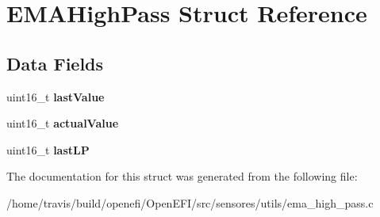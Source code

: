 \hypertarget{structEMAHighPass}{}\section{E\+M\+A\+High\+Pass Struct Reference}
\label{structEMAHighPass}
\subsection*{Data Fields}
\begin{DoxyCompactItemize}
\item 
uint16\+\_\+t {\bfseries last\+Value}\hypertarget{structEMAHighPass_a53df4bb1628740263789e44d94d75b26}{}\label{structEMAHighPass_a53df4bb1628740263789e44d94d75b26}

\item 
uint16\+\_\+t {\bfseries actual\+Value}\hypertarget{structEMAHighPass_a405250df44c61a455d676a0f13bfe32b}{}\label{structEMAHighPass_a405250df44c61a455d676a0f13bfe32b}

\item 
uint16\+\_\+t {\bfseries last\+LP}\hypertarget{structEMAHighPass_a38075a21f728f8d39f150825dbc45ef5}{}\label{structEMAHighPass_a38075a21f728f8d39f150825dbc45ef5}

\end{DoxyCompactItemize}


The documentation for this struct was generated from the following file\+:\begin{DoxyCompactItemize}
\item 
/home/travis/build/openefi/\+Open\+E\+F\+I/src/sensores/utils/ema\+\_\+high\+\_\+pass.\+c\end{DoxyCompactItemize}
